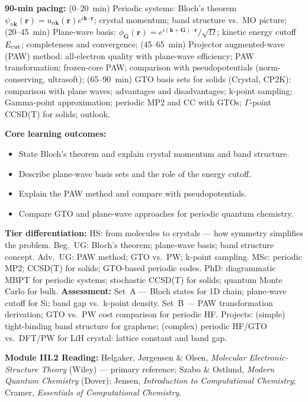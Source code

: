 \documentclass[11pt,a4paper]{article}
\begin{document}
\begin{tcolorbox}[chembox, title={Module~III.2 / L16: Glimpse into the Solid State}]
\textbf{90-min pacing:} (0--20~min) Periodic systems: Bloch's theorem $\psi_{n\mathbf{k}}(\mathbf{r})=u_{n\mathbf{k}}(\mathbf{r})e^{i\mathbf{k}\cdot\mathbf{r}}$; crystal momentum; band structure vs.\ MO picture; (20--45~min) Plane-wave basis: $\phi_\mathbf{G}(\mathbf{r})=e^{i(\mathbf{k}+\mathbf{G})\cdot\mathbf{r}}/\sqrt{\Omega}$; kinetic energy cutoff $E_{\rm cut}$; completeness and convergence; (45--65~min) Projector augmented-wave (PAW) method: all-electron quality with plane-wave efficiency; PAW transformation; frozen-core PAW; comparison with pseudopotentials (norm-conserving, ultrasoft); (65--90~min) GTO basis sets for solids (Crystal, CP2K): comparison with plane waves; advantages and disadvantages; k-point sampling; Gamma-point approximation; periodic MP2 and CC with GTOs; $\Gamma$-point CCSD(T) for solids; outlook.

\medskip\textbf{Core learning outcomes:}
\begin{itemize}[leftmargin=1.4em,topsep=2pt,itemsep=1pt]
  \item State Bloch's theorem and explain crystal momentum and band structure.
  \item Describe plane-wave basis sets and the role of the energy cutoff.
  \item Explain the PAW method and compare with pseudopotentials.
  \item Compare GTO and plane-wave approaches for periodic quantum chemistry.
\end{itemize}
\medskip\textbf{Tier differentiation:}
HS: from molecules to crystals --- how symmetry simplifies the problem.
Beg.\ UG: Bloch's theorem; plane-wave basis; band structure concept.
Adv.\ UG: PAW method; GTO vs.\ PW; k-point sampling.
MSc: periodic MP2; CCSD(T) for solids; GTO-based periodic codes.
PhD: diagrammatic MBPT for periodic systems; stochastic CCSD(T) for solids; quantum Monte Carlo for bulk.
\medskip\textbf{Assessment:}
Set~A --- Bloch states for 1D chain; plane-wave cutoff for Si; band gap vs.\ k-point density.
Set~B --- PAW transformation derivation; GTO vs.\ PW cost comparison for periodic HF.
Projects: (simple) tight-binding band structure for graphene; (complex) periodic HF/GTO vs.\ DFT/PW for LiH crystal: lattice constant and band gap.
\end{tcolorbox}

\begin{tcolorbox}[highlightbox]
\textbf{Module III.2 Reading:} Helgaker, J\o rgensen \& Olsen, \textit{Molecular Electronic-Structure Theory} (Wiley) --- primary reference; Szabo \& Ostlund, \textit{Modern Quantum Chemistry} (Dover); Jensen, \textit{Introduction to Computational Chemistry}; Cramer, \textit{Essentials of Computational Chemistry}.
\end{tcolorbox}
\end{document}
